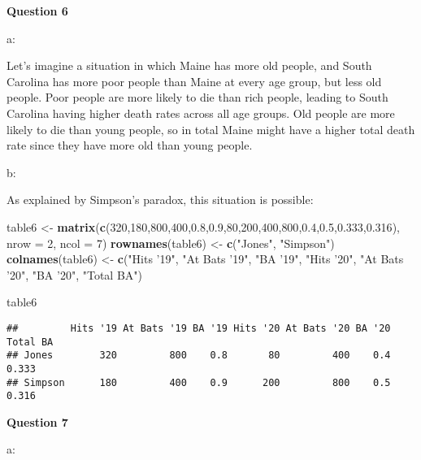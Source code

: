 \documentclass[
]{article}
\newenvironment{Shaded}{\begin{snugshade}}{\end{snugshade}}
\newcommand{\DataTypeTok}[1]{\textcolor[rgb]{0.13,0.29,0.53}{#1}}
\newcommand{\DecValTok}[1]{\textcolor[rgb]{0.00,0.00,0.81}{#1}}
\newcommand{\FloatTok}[1]{\textcolor[rgb]{0.00,0.00,0.81}{#1}}
\newcommand{\KeywordTok}[1]{\textcolor[rgb]{0.13,0.29,0.53}{\textbf{#1}}}
\newcommand{\NormalTok}[1]{#1}
\newcommand{\StringTok}[1]{\textcolor[rgb]{0.31,0.60,0.02}{#1}}
\begin{document}
\textbf{Question 6}

a:

Let's imagine a situation in which Maine has more old people, and South
Carolina has more poor people than Maine at every age group, but less
old people. Poor people are more likely to die than rich people, leading
to South Carolina having higher death rates across all age groups. Old
people are more likely to die than young people, so in total Maine might
have a higher total death rate since they have more old than young
people.

b:

As explained by Simpson's paradox, this situation is possible:

\begin{Shaded}
\begin{Highlighting}[]
\NormalTok{table6 <-}\StringTok{ }\KeywordTok{matrix}\NormalTok{(}\KeywordTok{c}\NormalTok{(}\DecValTok{320}\NormalTok{,}\DecValTok{180}\NormalTok{,}\DecValTok{800}\NormalTok{,}\DecValTok{400}\NormalTok{,}\FloatTok{0.8}\NormalTok{,}\FloatTok{0.9}\NormalTok{,}\DecValTok{80}\NormalTok{,}\DecValTok{200}\NormalTok{,}\DecValTok{400}\NormalTok{,}\DecValTok{800}\NormalTok{,}\FloatTok{0.4}\NormalTok{,}\FloatTok{0.5}\NormalTok{,}\FloatTok{0.333}\NormalTok{,}\FloatTok{0.316}\NormalTok{), }\DataTypeTok{nrow =} \DecValTok{2}\NormalTok{, }\DataTypeTok{ncol =} \DecValTok{7}\NormalTok{)}
\KeywordTok{rownames}\NormalTok{(table6) <-}\StringTok{ }\KeywordTok{c}\NormalTok{(}\StringTok{"Jones"}\NormalTok{, }\StringTok{"Simpson"}\NormalTok{)}
\KeywordTok{colnames}\NormalTok{(table6) <-}\StringTok{ }\KeywordTok{c}\NormalTok{(}\StringTok{"Hits '19"}\NormalTok{, }\StringTok{"At Bats '19"}\NormalTok{, }\StringTok{"BA '19"}\NormalTok{, }\StringTok{"Hits '20"}\NormalTok{, }\StringTok{"At Bats '20"}\NormalTok{, }\StringTok{"BA '20"}\NormalTok{, }\StringTok{"Total BA"}\NormalTok{)}

\NormalTok{table6}
\end{Highlighting}
\end{Shaded}

\begin{verbatim}
##         Hits '19 At Bats '19 BA '19 Hits '20 At Bats '20 BA '20 Total BA
## Jones        320         800    0.8       80         400    0.4    0.333
## Simpson      180         400    0.9      200         800    0.5    0.316
\end{verbatim}

\textbf{Question 7}

a:
\end{document}
